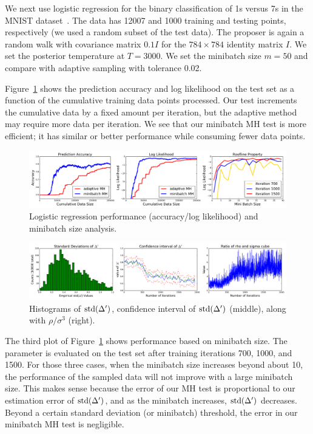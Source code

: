 \documentclass{article}
\begin{document}
We next use logistic regression for the binary classification of 1s versus 7s in the MNIST
dataset~\cite{lecun-mnisthandwrittendigit-2010}. The data has 12007 and 1000 training and testing
points, respectively (we used a random subset of the test data). The proposer is again a random walk
with covariance matrix $0.1I$ for the $784\times 784$ identity matrix $I$. We set the posterior
temperature at $T=3000$. We set the minibatch size $m=50$ and compare with adaptive sampling with
tolerance 0.02.

Figure~\ref{fig:logistic_fig} shows the prediction accuracy and log likelihood on the test set as a
function of the cumulative training data points processed. Our test increments the cumulative data
by a fixed amount per iteration, but the adaptive method may require more data per iteration.  We
see that our minibatch MH test is more efficient; it has similar or better performance while
consuming fewer data points.

\begin{figure}[t]
    \centering
    \includegraphics[width=1\linewidth]{exp2.png}
    \caption{Logistic regression performance (accuracy/log likelihood) and minibatch size analysis.}
    \label{fig:logistic_fig}
    \vspace{-10pt}
\end{figure}

\begin{figure}[t]
    \centering
    \includegraphics[width=1\linewidth]{CI_v02.png}
    \caption{
    Histograms of ${\rm std}(\Delta')$, confidence interval of ${\rm std}(\Delta')$ (middle), along with $\rho / \sigma^3$ (right).
    }
    \label{fig:exp_3}
\end{figure}

The third plot of Figure~\ref{fig:logistic_fig} shows performance based on minibatch size. The
parameter is evaluated on the test set after training iterations 700, 1000, and 1500. For those
three cases, when the minibatch size increases beyond about 10, the performance of the sampled data
will not improve with a large minibatch size. This makes sense because the error of our MH test is
proportional to our estimation error of ${\rm std}(\Delta')$, and as the minibatch increases, ${\rm
std}(\Delta')$ decreases. Beyond a certain standard deviation (or minibatch) threshold, the error in
our minibatch MH test is negligible.
\end{document}
